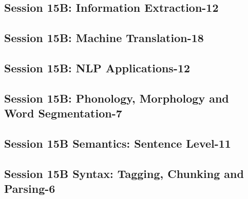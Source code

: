 \subsection{\large Session 15B: Information Extraction-12}
\label{parallel-session-15B-trackB}
\TrackBLoc\hfill\sessionchair{}{}
\clearpage
\subsection{\large Session 15B: Machine Translation-18}
\label{parallel-session-15B-trackC}
\TrackCLoc\hfill\sessionchair{}{}
\clearpage
\subsection{\large Session 15B: NLP Applications-12}
\label{parallel-session-15B-trackD}
\TrackDLoc\hfill\sessionchair{}{}
\clearpage
\subsection{\large Session 15B: Phonology, Morphology and Word Segmentation-7}
\label{parallel-session-15B-trackE}
\TrackELoc\hfill\sessionchair{}{}
\clearpage
\subsection{\large Session 15B Semantics: Sentence Level-11}
\label{parallel-session-15B-trackF}
\TrackFLoc\hfill\sessionchair{}{}
\clearpage
\subsection{\large Session 15B Syntax: Tagging, Chunking and Parsing-6}
\label{parallel-session-15B-trackG}
\TrackGLoc\hfill\sessionchair{}{}
\clearpage
